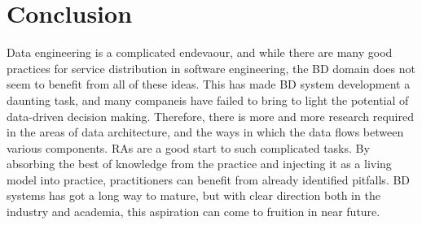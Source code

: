 \documentclass[review]{elsarticle}
\begin{document}
\section{Conclusion}

Data engineering is a complicated endevaour, and while there are many good practices for service distribution in software engineering, the BD domain does not seem to benefit from all of these ideas. This has made BD system development a daunting task, and many companeis have failed to bring to light the potential of data-driven decision making. Therefore, there is more and more research required in the areas of data architecture, and the ways in which the data flows between various components. RAs are a good start to such complicated tasks. By absorbing the best of knowledge from the practice and injecting it as a living model into practice, practitioners can benefit from already identified pitfalls. BD systems has got a long way to mature, but with clear direction both in the industry and academia, this aspiration can come to fruition in near future.



\appendix
\end{document}
